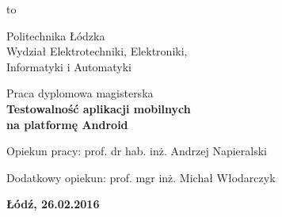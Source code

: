 \begin{titlepage}
    \vbox to \textheight
    {
        \begin{center}
            \begin{center}
                \LARGE
                Politechnika Łódzka \\
                Wydział Elektrotechniki, Elektroniki, \\
				Informatyki i Automatyki

            \end{center}

        \vspace*{3.75\baselineskip}
        \par\vspace{\smallskipamount}

        \vspace*{2\baselineskip}
        {\large
        Praca dyplomowa magisterska\\
        \huge\bfseries 
        Testowalność aplikacji mobilnych\\ na platformę Android\par}

        \vspace{2\baselineskip}{Rafał Sowiak\\Nr albumu: 199564\par}

        \vspace*{7\baselineskip}
        {Opiekun pracy: prof. dr hab. inż. Andrzej Napieralski\par}
        {Dodatkowy opiekun: prof. mgr inż. Michał Włodarczyk\par}

        \vspace*{2\baselineskip}

        \begin{center}
            \textbf{Łódź, 26.02.2016}
        \end{center}

        \end{center}
    }
\end{titlepage}
